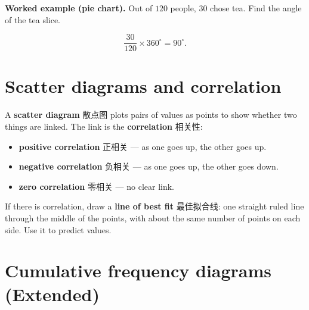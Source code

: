 \documentclass[11pt]{article}
\begin{document}
\begin{center}
\end{center}

\textbf{Worked example (pie chart).} Out of $120$ people, $30$ chose tea. Find the angle of the tea slice.

\[
\frac{30}{120} \times 360^{\circ} = 90^{\circ}.
\]

\section*{Scatter diagrams and correlation}

A \textbf{scatter diagram} 散点图 plots pairs of values as points to show whether two things are linked. The link is the \textbf{correlation} 相关性:

\begin{itemize}
\item \textbf{positive correlation} 正相关 — as one goes up, the other goes up.

\item \textbf{negative correlation} 负相关 — as one goes up, the other goes down.

\item \textbf{zero correlation} 零相关 — no clear link.

\end{itemize}

If there is correlation, draw a \textbf{line of best fit} 最佳拟合线: one straight ruled line through the middle of the points, with about the same number of points on each side. Use it to predict values.

\section*{Cumulative frequency diagrams (Extended)}
\end{document}
